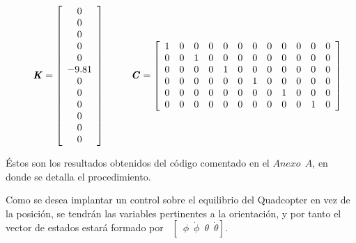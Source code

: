 \documentclass[twoside,11pt]{book}
\begin{document}
\begin{equation}
\hspace*{0.5cm} \pmb{K}= \left[ \begin{array}{c}
0 \\
0 \\
0 \\
0 \\
0 \\
-9.81 \\
0 \\
0 \\
0 \\
0 \\
0 \\
0 \\ \end{array} \right]  \hspace*{1cm} \pmb{C}=\left[ \begin{array}{cccccccccccc}
1 & 0 & 0 & 0 & 0 & 0 & 0 & 0 & 0 & 0 & 0 & 0 \\
0 & 0 & 1 & 0 & 0 & 0 & 0 & 0 & 0 & 0 & 0 & 0 \\
0 & 0 & 0 & 0 & 1 & 0 & 0 & 0 & 0 & 0 & 0 & 0 \\
0 & 0 & 0 & 0 & 0 & 0 & 1 & 0 & 0 & 0 & 0 & 0 \\
0 & 0 & 0 & 0 & 0 & 0 & 0 & 0 & 1 & 0 & 0 & 0 \\
0 & 0 & 0 & 0 & 0 & 0 & 0 & 0 & 0 & 0 & 1 & 0 \\ \end{array} \right]
\end{equation}

Éstos son los resultados obtenidos del código comentado en el $Anexo \>\>A$, en donde se detalla el procedimiento.

Como se desea implantar un control sobre el equilibrio del Quadcopter en vez de la posición, se tendrán las variables pertinentes a la orientación, y por tanto el vector de estados estará formado por %
$\enspace \left[ \enspace \phi \enspace \dot{\phi} \enspace \theta \enspace \dot{\theta} \right]$. 
\end{document}

